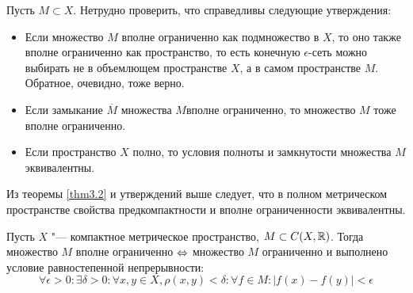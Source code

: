 \begin{note}
    Пусть $M \subset X$. Нетрудно проверить, что справедливы следующие утверждения:
    \begin{itemize}
        \item Если множество $M$ вполне ограниченно как подмножество в $X$, то оно также вполне ограниченно как пространство, то есть конечную $\epsilon$-сеть можно выбирать не в объемлющем пространстве $X$, а в самом пространстве $M$. Обратное, очевидно, тоже верно.
        
        \item Если замыкание $\overline M$ множества $M$вполне ограниченно, то множество $M$ тоже вполне ограниченно.
        
        \item Если пространство $X$ полно, то условия полноты и замкнутости множества $M$ эквивалентны.
    \end{itemize}

    Из теоремы \ref{thm3.2} и утверждений выше следует, что в полном метрическом пространстве свойства предкомпактности и вполне ограниченности эквивалентны.
\end{note}

\begin{theorem}
    Пусть $X$ "--- компактное метрическое пространство, $M \subset C(X, \mathbb{R})$. Тогда множество $M$ вполне ограниченно $\Leftrightarrow$ множество $M$ ограниченно и выполнено условие равностепенной непрерывности:
    \[
        \forall \epsilon > 0: \exists \delta > 0: \forall x, y \in X, \rho(x, y) < \delta: \forall f \in M: |f(x) - f(y)| < \epsilon 
    \]
\end{theorem}

